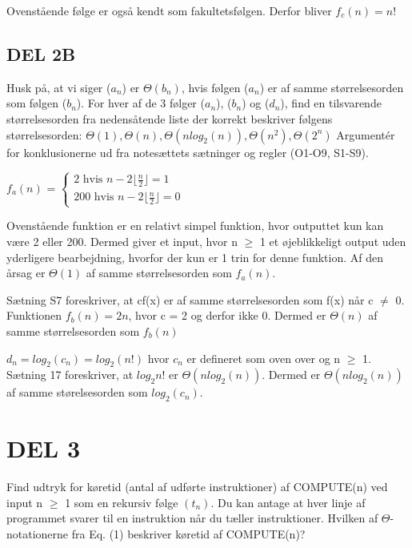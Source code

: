 \documentclass[a4paper]{article}
\begin{document}
\noindent
\newline
Ovenstående følge er også kendt som fakultetsfølgen. Derfor bliver $f_{c}(n) = n!$

\subsection{DEL 2B}
Husk på, at vi siger ($a_{n}$) er $\Theta(b_{n})$, hvis følgen ($a_{n}$) er af samme størrelsesorden som følgen ($b_{n}$). For hver af de 3 følger ($a_{n}$), ($b_{n}$) og ($d_{n}$), find en tilsvarende størrelsesorden fra nedensåtende liste der korrekt beskriver følgens størrelsesorden: 
\newline $\Theta(1), \Theta(n), \Theta(nlog_{2}(n)), \Theta(n^{2}), \Theta(2^{n})$
\newline
Argumentér for konklusionerne ud fra notesættets sætninger og regler (O1-O9, S1-S9). 

\bigskip
\noindent
$f_{a}(n)$ = $\left\{\begin{array}{cc} 2 \mbox{~hvis~} n-2\lfloor{\frac{n}{2}}\rfloor = 1 \\
200 \mbox{~hvis~} n-2\lfloor{\frac{n}{2}}\rfloor = 0 \end{array}\right.$

\bigskip
\noindent
Ovenstående funktion er en relativt simpel funktion, hvor outputtet kun kan være 2 eller 200. Dermed giver et input, hvor n $\geq$ 1 et øjeblikkeligt output uden yderligere bearbejdning, hvorfor der kun er 1 trin for denne funktion. Af den årsag er $\Theta(1)$ af samme størrelsesorden som $f_{a}(n)$. %

\bigskip
\noindent
Sætning S7 foreskriver, at cf(x) er af samme størrelsesorden som f(x) når c $\neq$ 0. Funktionen $f_{b}(n) = 2n$, hvor c = 2 og derfor ikke 0. Dermed er $\Theta(n)$ af samme størrelsesorden som $f_{b}(n)$

\bigskip
\noindent
$d_{n} = log_{2}(c_{n}) = log_{2}(n!)$ hvor $c_{n}$ er defineret som oven over og n $\geq$ 1. \\
Sætning 17 foreskriver, at $log_{2}n!$ er $\Theta(nlog_{2}(n))$. Dermed er $\Theta(nlog_{2}(n))$ af samme størelsesorden som $log_{2}(c_{n})$. 



\section{DEL 3}
Find udtryk for køretid (antal af udførte instruktioner) af COMPUTE(n) ved input n $\geq$ 1 som en rekursiv følge $(t_{n})$. Du kan antage at hver linje af programmet svarer til en instruktion når du tæller instruktioner. Hvilken af $\Theta$-notationerne fra Eq. (1) beskriver køretid af COMPUTE(n)?
\end{document}
